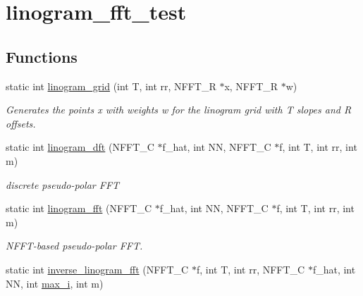 \hypertarget{group__applications__polarFFT__linogramm}{\section{linogram\-\_\-fft\-\_\-test}
\label{group__applications__polarFFT__linogramm}
}
\subsection*{Functions}
\begin{DoxyCompactItemize}
\item 
\hypertarget{group__applications__polarFFT__linogramm_ga8c7fd1c80e5aaf7969c8e2b2085b04e6}{static int \hyperlink{group__applications__polarFFT__linogramm_ga8c7fd1c80e5aaf7969c8e2b2085b04e6}{linogram\-\_\-grid} (int T, int rr, N\-F\-F\-T\-\_\-\-R $\ast$x, N\-F\-F\-T\-\_\-\-R $\ast$w)}\label{group__applications__polarFFT__linogramm_ga8c7fd1c80e5aaf7969c8e2b2085b04e6}

\begin{DoxyCompactList}\small\item\em Generates the points x with weights w for the linogram grid with T slopes and R offsets. \end{DoxyCompactList}\item 
\hypertarget{group__applications__polarFFT__linogramm_gaf380152403e302c6f0abfd90374aacca}{static int \hyperlink{group__applications__polarFFT__linogramm_gaf380152403e302c6f0abfd90374aacca}{linogram\-\_\-dft} (N\-F\-F\-T\-\_\-\-C $\ast$f\-\_\-hat, int N\-N, N\-F\-F\-T\-\_\-\-C $\ast$f, int T, int rr, int m)}\label{group__applications__polarFFT__linogramm_gaf380152403e302c6f0abfd90374aacca}

\begin{DoxyCompactList}\small\item\em discrete pseudo-\/polar F\-F\-T \end{DoxyCompactList}\item 
\hypertarget{group__applications__polarFFT__linogramm_ga3472a8e0ab4b67dc1cfd0cc2d8fd9e2a}{static int \hyperlink{group__applications__polarFFT__linogramm_ga3472a8e0ab4b67dc1cfd0cc2d8fd9e2a}{linogram\-\_\-fft} (N\-F\-F\-T\-\_\-\-C $\ast$f\-\_\-hat, int N\-N, N\-F\-F\-T\-\_\-\-C $\ast$f, int T, int rr, int m)}\label{group__applications__polarFFT__linogramm_ga3472a8e0ab4b67dc1cfd0cc2d8fd9e2a}

\begin{DoxyCompactList}\small\item\em N\-F\-F\-T-\/based pseudo-\/polar F\-F\-T. \end{DoxyCompactList}\item 
\hypertarget{group__applications__polarFFT__linogramm_ga21954220a11d3cda4a103e5694c75164}{static int \hyperlink{group__applications__polarFFT__linogramm_ga21954220a11d3cda4a103e5694c75164}{inverse\-\_\-linogram\-\_\-fft} (N\-F\-F\-T\-\_\-\-C $\ast$f, int T, int rr, N\-F\-F\-T\-\_\-\-C $\ast$f\-\_\-hat, int N\-N, int \hyperlink{group__applications__fastsum_ga6bc571f685f894e15b83a848a0a30faa}{max\-\_\-i}, int m)}\label{group__applications__polarFFT__linogramm_ga21954220a11d3cda4a103e5694c75164}


\end{DoxyCompactItemize}
